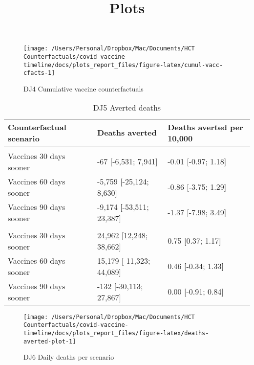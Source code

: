 \documentclass[
]{article}
\title{Plots}
\author{}
\date{\vspace{-2.5em}}
\begin{document}
\maketitle

\begin{figure}

{\centering \texttt{[image: /Users/Personal/Dropbox/Mac/Documents/HCT Counterfactuals/covid-vaccine-timeline/docs/plots\_report\_files/figure-latex/cumul-vacc-cfacts-1]} 

}

\caption{DJ4 Cumulative vaccine counterfactuals}\label{fig:cumul-vacc-cfacts}
\end{figure}

\begin{table}

\caption{\label{tab:deaths-averted-table}DJ5 Averted deaths}
\centering
\begin{tabular}[t]{lll}
\toprule
Counterfactual scenario & Deaths averted & Deaths averted per 10,000\\
\midrule
\addlinespace[0.3em]
\multicolumn{3}{l}{\textbf{United Kingdom}}\\
\hspace{1em}Vaccines 30 days sooner & -67 [-6,531; 7,941] & -0.01 [-0.97; 1.18]\\
\hspace{1em}Vaccines 60 days sooner & -5,759 [-25,124; 8,630] & -0.86 [-3.75; 1.29]\\
\hspace{1em}Vaccines 90 days sooner & -9,174 [-53,511; 23,387] & -1.37 [-7.98; 3.49]\\
\addlinespace[0.3em]
\multicolumn{3}{l}{\textbf{United States}}\\
\hspace{1em}Vaccines 30 days sooner & 24,962 [12,248; 38,662] & 0.75 [0.37; 1.17]\\
\hspace{1em}Vaccines 60 days sooner & 15,179 [-11,323; 44,089] & 0.46 [-0.34; 1.33]\\
\hspace{1em}Vaccines 90 days sooner & -132 [-30,113; 27,867] & 0.00 [-0.91; 0.84]\\
\bottomrule
\end{tabular}
\end{table}

\begin{figure}

{\centering \texttt{[image: /Users/Personal/Dropbox/Mac/Documents/HCT Counterfactuals/covid-vaccine-timeline/docs/plots\_report\_files/figure-latex/deaths-averted-plot-1]} 

}

\caption{DJ6 Daily deaths per scenario}\label{fig:deaths-averted-plot}
\end{figure}
\end{document}
